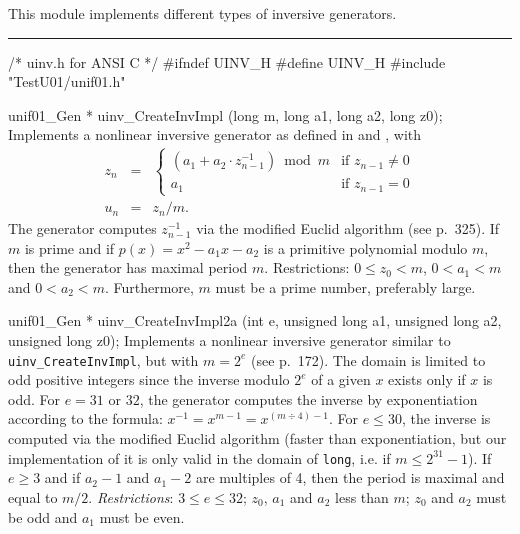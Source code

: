
This module implements different types of inversive generators.

\bigskip
\hrule
\code
\hide
/* uinv.h for ANSI C */
#ifndef UINV_H
#define UINV_H
\endhide
#include "TestU01/unif01.h"


unif01_Gen * uinv_CreateInvImpl (long m, long a1, long a2, long z0);
\endcode
  \tab Implements a nonlinear inversive generator as
   defined in \cite{rEIC92c} and \cite[p.93]{rLEC90a}, with
  \begin{eqnarray*}
         z_n &=& \left\{ \begin{array}{ll}
      (a_1 + a_2\cdot z_{n-1}^{-1})\bmod m & \mbox{if $z_{n-1}\not=0$}\\[6pt]
       a_1                                       & \mbox{if $z_{n-1} = 0$}
    \end{array} \right.\\
   u_n &=& z_n / m.
  \end{eqnarray*}
   The generator computes $z_{n-1}^{-1}$ via the modified
%
   Euclid algorithm (see \cite{rKNU81a} p.~325).
   If $m$ is prime and if $p(x) = x^2 - a_1 x - a_2$ is a
   primitive polynomial modulo $m$, then the generator has
    maximal  period $m$.
   Restrictions: $0 \le z_0 < m$,
   $0 < a_1 < m$ and $0 < a_2 < m$.  Furthermore, $m$ must be a prime
   number, preferably large. %
  \endtab
\code


unif01_Gen * uinv_CreateInvImpl2a (int e, unsigned long a1,
                                   unsigned long a2, unsigned long z0);
\endcode
  \tab Implements a nonlinear inversive generator similar to
    {\tt uinv\_CreateInvImpl}, but with $m = 2^e$
   (see \cite{rEIC92c} p.~172).
   The  domain is limited to odd positive integers since
   the inverse modulo $2^e$ of a given $x$ exists only if $x$ is odd.
   For $e = 31$ or $32$, the generator computes
   the inverse by exponentiation according to the formula:
   $x^{-1} = x^{m-1} = x^{(m \div 4) - 1}$.
   For $e \le 30$, the inverse is computed via the modified
   Euclid algorithm (faster than exponentiation,
   but our implementation of it is only valid in the domain
   of {\tt long}, i.e. if $m \le 2^{31}-1$).
   If $e\ge 3$ and if $a_2-1$ and $a_1-2$ are multiples of 4,
   then the period is  maximal and equal to $m/2$.
   \emph{Restrictions}:  $3 \le e \le 32$; $z_0$, $a_1$ and $a_2$ less than
   $m$; $z_0$ and $a_2$ must be odd and $a_1$ must be even.
  \endtab
\code


